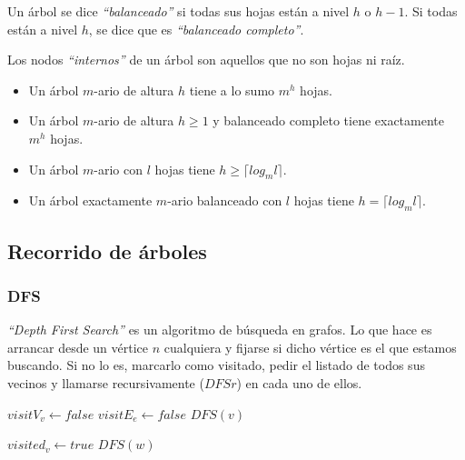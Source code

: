 Un \'arbol se dice \emph{``balanceado''} si todas sus hojas est\'an a nivel $h$ o $h-1$. Si todas est\'an a nivel $h$, se dice que es \emph{``balanceado completo''}.

Los nodos \emph{``internos''} de un \'arbol son aquellos que no son hojas ni ra\'iz.

\begin{itemize}
\item Un \'arbol $m$-ario de altura $h$ tiene a lo sumo $m^h$ hojas. 
\item Un \'arbol $m$-ario de altura $h \geq 1$ y balanceado completo tiene exactamente $m^h$ hojas.
\item Un \'arbol $m$-ario con $l$ hojas tiene $h \geq \lceil log_{m}l \rceil$.
\item Un \'arbol exactamente $m$-ario balanceado con $l$ hojas tiene $h = \lceil log_{m}l \rceil$.
\end{itemize}

\subsection{Recorrido de \'arboles}
\subsubsection{DFS}

\emph{``Depth First Search''} es un algoritmo de b\'usqueda en grafos. Lo que hace es arrancar desde un v\'ertice $n$ cualquiera y fijarse si dicho v\'ertice es el que estamos buscando. Si no lo es, marcarlo como visitado, pedir el listado de todos sus vecinos y llamarse recursivamente ($DFSr$) en cada uno de ellos.
\vspace{8px}

\begin{algorithm}
\begin{algorithmic}[1]
    \State $visitV_v \gets false$
  \EndFor
    \State $visitE_e \gets false$
  \EndFor
      \State $DFS(v)$
    \EndIf
  \EndFor
\EndFunction
\end{algorithmic}
\end{algorithm}

\begin{algorithm}
\begin{algorithmic}[1]
  \State $visited_v \gets true$
      \State $DFS(w)$
    \EndIf
  \EndFor
\EndFunction
\end{algorithmic}
\end{algorithm}

